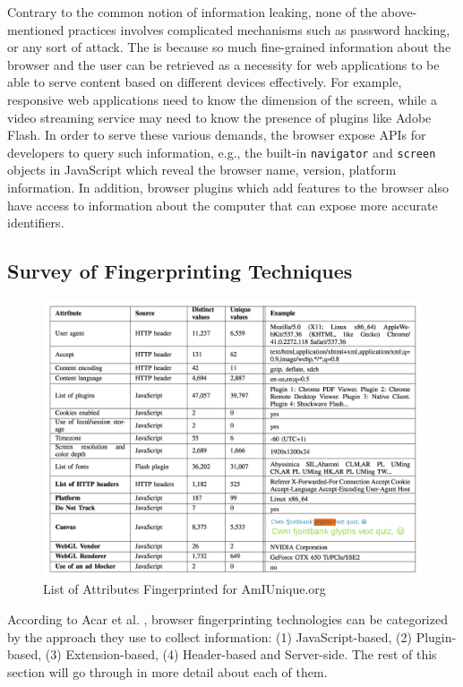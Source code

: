 \documentclass{acm_proc_article-sp}
\begin{document}
Contrary to the common notion of information leaking, none of the above-mentioned practices involves complicated mechanisms such as password hacking, or any sort of attack. The is because so much fine-grained information about the browser and the user can be retrieved as a necessity for web applications to be able to serve content based on different devices effectively. For example, responsive web applications need to know the dimension of the screen, while a video streaming service may need to know the presence of plugins like Adobe Flash. 
In order to serve these various demands, the browser expose APIs for developers to query such information, e.g., the built-in \verb|navigator| and \verb|screen| objects in JavaScript which reveal the browser name, version, platform information. 
In addition, browser plugins which add  features to the browser also have access to information about the computer that can expose more accurate identifiers.

\subsection{Survey of Fingerprinting Techniques}

\begin{figure}[h]
    \centering
    \includegraphics[width=\textwidth]{assets/amiunique.png}
    \caption{List of Attributes Fingerprinted for AmIUnique.org}
    \label{fig:amiunique}
\end{figure}


According to Acar et al. \cite{acar:fpd}, browser fingerprinting technologies can be categorized by the approach they use to collect information: (1) JavaScript-based, (2) Plugin-based, (3) Extension-based, (4) Header-based and Server-side.
The rest of this section will go through in more detail about each of them.
\end{document}
